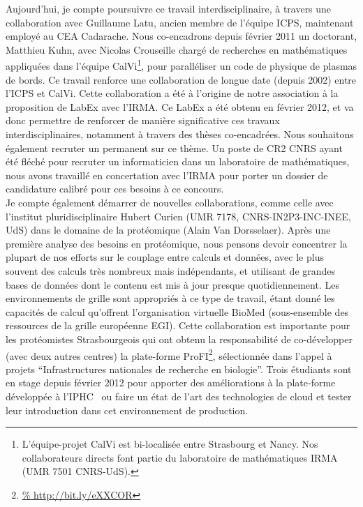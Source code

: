 \documentclass[11pt]{article}
\begin{document}
Aujourd'hui, je compte poursuivre ce travail interdisciplinaire, à travers 
une collaboration avec Guillaume Latu, ancien membre de l'équipe ICPS, 
maintenant employé au CEA Cadarache. Nous co-encadrons depuis février 2011 un 
doctorant, Matthieu Kuhn, avec Nicolas Crouseille chargé de recherches en 
mathématiques appliquées dans l'équipe CalVi\footnote{L'équipe-projet CalVi
est bi-localisée entre Strasbourg et Nancy.  Nos collaborateurs directs font 
partie du laboratoire de mathématiques IRMA (UMR 7501 CNRS-UdS).}, pour 
paralléliser un code de physique de plasmas de bords. Ce travail renforce une 
collaboration de longue date (depuis 2002) entre l'ICPS et CalVi. Cette 
collaboration a été à l'origine de notre association à la proposition de LabEx 
avec l'IRMA. Ce LabEx a été obtenu en février 2012, et va donc permettre de 
renforcer de manière significative ces travaux interdisciplinaires, notamment 
à travers des thèses co-encadrées. Nous souhaitons également recruter un 
permanent sur ce thème. Un poste de CR2 CNRS ayant été fléché pour recruter
un informaticien dans un laboratoire de mathématiques, nous avons travaillé
en concertation avec l'IRMA pour porter un dossier de candidature calibré 
pour ces besoins à ce concours.\\  


Je compte également démarrer de nouvelles collaborations, comme celle avec 
l'institut pluridisciplinaire Hubert Curien (UMR 7178, CNRS-IN2P3-INC-INEE, UdS) 
dans le domaine de la protéomique (Alain Van Dorsselaer). Après une première 
analyse des besoins en protéomique, nous pensons devoir concentrer la plupart 
de nos efforts sur le couplage entre calculs et données, avec le plus souvent 
des calculs très nombreux mais indépendants, et utilisant de grandes bases de 
données dont le contenu est mis à jour presque quotidiennement. Les 
environnements de grille sont appropriés à ce type de travail, étant donné les
capacités de calcul qu'offrent l'organisation virtuelle BioMed (sous-ensemble
des ressources de la grille européenne EGI). Cette collaboration est importante
pour les protéomistes Strasbourgeois qui ont obtenu la responsabilité de
co-développer (avec deux autres centres) la plate-forme ProFI\footnote{\url{%
http://bit.ly/eXXCOR}}, sélectionnée dans l'appel à projets ``Infrastructures 
nationales de recherche en  biologie''. Trois étudiants sont en stage depuis
février 2012 pour apporter des améliorations à la plate-forme développée à
l'IPHC~\cite{iphc-2011} ou faire un état de l'art des technologies de cloud
et tester leur introduction dans cet environnement de production.
 
\end{document}
